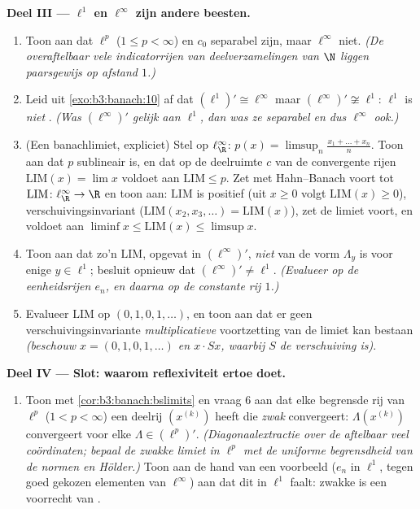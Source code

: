 \begin{problem}[{Weekendopgave --- $(\ell^p)' = \ell^q$,
reflexiviteit, en het vreemde van $\ell^\infty$}]
\medskip
\noindent\textbf{Deel III --- $\ell^1$ en $\ell^\infty$ zijn
andere beesten.}
\begin{enumerate}[resume]
  \item Toon aan dat $\ell^p$ ($1 \leq p < \infty$) en $c_0$
        separabel zijn, maar $\ell^\infty$ niet. \emph{(De
        overaftelbaar vele indicatorrijen van deelverzamelingen
        van $\N$ liggen paarsgewijs op afstand $1$.)}
  \item Leid uit \cref{exo:b3:banach:10} af dat $(\ell^1)' \cong
        \ell^\infty$ maar $(\ell^\infty)' \not\cong \ell^1$:
        $\ell^1$ is \emph{niet} . \emph{(Was
        $(\ell^\infty)'$ gelijk aan $\ell^1$, dan was ze separabel
        en dus $\ell^\infty$ ook.)}
  \item (Een banachlimiet, expliciet) Stel op $\ell^\infty_\R$:
        $p(x) = \limsup_n \frac{x_1 + \dots + x_n}{n}$. Toon aan
        dat $p$ sublineair is, en dat op de deelruimte $c$ van de
        convergente rijen $\mathrm{LIM}(x) = \lim x$ voldoet aan
        $\mathrm{LIM} \leq p$. Zet met Hahn--Banach voort tot
        $\mathrm{LIM} \colon \ell^\infty_\R \to \R$ en toon aan:
        $\mathrm{LIM}$ is positief (uit $x \geq 0$ volgt
        $\mathrm{LIM}(x) \geq 0$), verschuivingsinvariant
        ($\mathrm{LIM}(x_2, x_3, \dots) = \mathrm{LIM}(x)$), zet
        de limiet voort, en voldoet aan $\liminf x \leq
        \mathrm{LIM}(x)\leq \limsup x$.
  \item Toon aan dat zo'n $\mathrm{LIM}$, opgevat in
        $(\ell^\infty)'$, \emph{niet} van de vorm $\Lambda_y$ is
        voor enige $y \in \ell^1$; besluit opnieuw dat
        $(\ell^\infty)' \neq \ell^1$. \emph{(Evalueer op de
        eenheidsrijen $e_n$, en daarna op de constante rij $1$.)}
  \item Evalueer $\mathrm{LIM}$ op $(0,1,0,1,\dots)$, en toon aan
        dat er geen verschuivingsinvariante
        \emph{multiplicatieve} voortzetting van de limiet kan
        bestaan \emph{(beschouw $x = (0,1,0,1,\dots)$ en $x\cdot
        Sx$, waarbij $S$ de verschuiving is)}.
\end{enumerate}

\medskip
\noindent\textbf{Deel IV --- Slot: waarom reflexiviteit ertoe
doet.}
\begin{enumerate}[resume]
  \item Toon met \cref{cor:b3:banach:bslimits} en vraag 6 aan dat
        elke begrensde rij van $\ell^p$ ($1 < p < \infty$) een
        deelrij $(x^{(k)})$ heeft die \emph{zwak} convergeert:
        $\Lambda(x^{(k)})$ convergeert voor elke $\Lambda \in
        (\ell^p)'$. \emph{(Diagonaalextractie over de aftelbaar
        veel coördinaten; bepaal de zwakke limiet in $\ell^p$ met
        de uniforme begrensdheid van de normen en Hölder.)} Toon
        aan de hand van een voorbeeld ($e_n$ in $\ell^1$, tegen
        goed gekozen elementen van $\ell^\infty$) aan dat dit in
        $\ell^1$ faalt: zwakke  is een voorrecht van
        .
\end{enumerate}


\end{problem}
